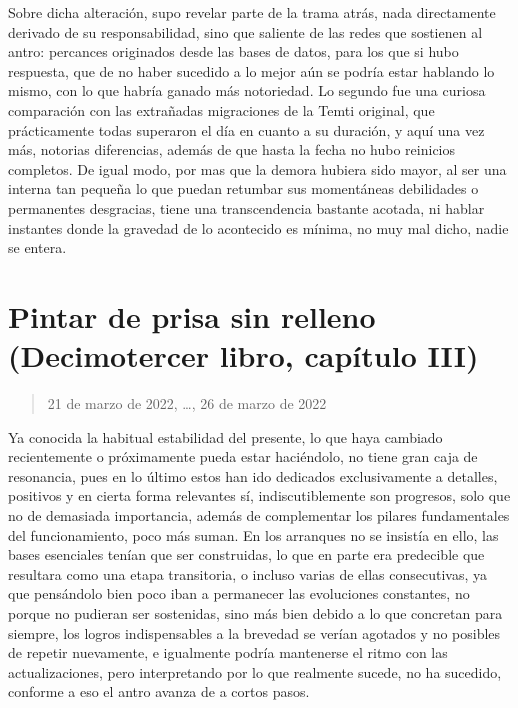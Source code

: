 \documentclass[
]{book}
\begin{document}
Sobre dicha alteración, supo revelar parte de la trama atrás, nada directamente derivado de su responsabilidad, sino que saliente de las redes que sostienen al antro: percances originados desde las bases de datos, para los que si hubo respuesta, que de no haber sucedido a lo mejor aún se podría estar hablando lo mismo, con lo que habría ganado más notoriedad. Lo segundo fue una curiosa comparación con las extrañadas migraciones de la Temti original, que prácticamente todas superaron el día en cuanto a su duración, y aquí una vez más, notorias diferencias, además de que hasta la fecha no hubo reinicios completos. De igual modo, por mas que la demora hubiera sido mayor, al ser una interna tan pequeña lo que puedan retumbar sus momentáneas debilidades o permanentes desgracias, tiene una transcendencia bastante acotada, ni hablar instantes donde la gravedad de lo acontecido es mínima, no muy mal dicho, nadie se entera.

\hypertarget{pintar-de-prisa-sin-relleno-decimotercer-libro-capuxedtulo-iii}{%
\section{Pintar de prisa sin relleno (Decimotercer libro, capítulo III)}\label{pintar-de-prisa-sin-relleno-decimotercer-libro-capuxedtulo-iii}}

\begin{quote}
21 de marzo de 2022, \ldots, 26 de marzo de 2022
\end{quote}

Ya conocida la habitual estabilidad del presente, lo que haya cambiado recientemente o próximamente pueda estar haciéndolo, no tiene gran caja de resonancia, pues en lo último estos han ido dedicados exclusivamente a detalles, positivos y en cierta forma relevantes sí, indiscutiblemente son progresos, solo que no de demasiada importancia, además de complementar los pilares fundamentales del funcionamiento, poco más suman. En los arranques no se insistía en ello, las bases esenciales tenían que ser construidas, lo que en parte era predecible que resultara como una etapa transitoria, o incluso varias de ellas consecutivas, ya que pensándolo bien poco iban a permanecer las evoluciones constantes, no porque no pudieran ser sostenidas, sino más bien debido a lo que concretan para siempre, los logros indispensables a la brevedad se verían agotados y no posibles de repetir nuevamente, e igualmente podría mantenerse el ritmo con las actualizaciones, pero interpretando por lo que realmente sucede, no ha sucedido, conforme a eso el antro avanza de a cortos pasos.
\end{document}
